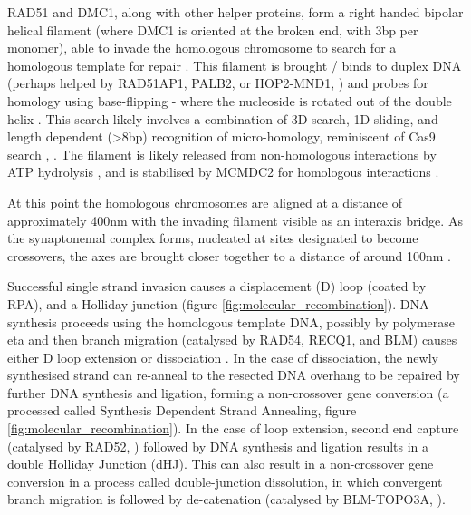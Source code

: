 RAD51 and DMC1, along with other helper proteins, form a right handed bipolar helical filament (where DMC1 is oriented at the broken end, with 3bp per monomer), able to invade the homologous chromosome to search for a homologous template for repair \parencite{Sehorn2004Human, Cloud2012Rad51, Brown2015Small, Brown2015DNA, Crickard2018Spontaneous}.
This filament is brought / binds to duplex DNA (perhaps helped by RAD51AP1, PALB2, or HOP2-MND1, \cite{Petukhova2005Hop2}) and probes for homology using base-flipping - where the nucleoside is rotated out of the double helix \parencite{Gupta1999Rapid, Folta-Stogniew2004Exchange}.
This search likely involves a combination of 3D search, 1D sliding, and length dependent (>8bp) recognition of micro-homology, reminiscent of Cas9 search \parencite{Ragunathan2012RecA,Forget2012Singlemolecule,Renkawitz2013Monitoring,Qi2015DNA,Lee2015Base}, \parencite[reviewed in][]{Barzel2008Finding, Renkawitz2014Mechanisms, Greene2016DNA, Kaniecki2018change, Haber2018DNA}.
The filament is likely released from non-homologous interactions by ATP hydrolysis \parencite{Lee2016ATP}, and is stabilised by MCMDC2 for homologous interactions \parencite{McNairn2017Repair}. 

At this point the homologous chromosomes are aligned at a distance of approximately 400nm with the invading filament visible as an interaxis bridge.
As the synaptonemal complex forms, nucleated at sites designated to become crossovers, the axes are brought closer together to a distance of around 100nm \parencite[reviewed in][]{Zickler2015Recombination}.

Successful single strand invasion causes a displacement (D) loop (coated by RPA), and a Holliday junction (figure \ref{fig:molecular_recombination}).
DNA synthesis proceeds using the homologous template DNA, possibly by polymerase eta \parencite{McIlwraith2005Human, Kawamoto2005Dual} and then branch migration (catalysed by RAD54, RECQ1, and BLM) causes either D loop extension or dissociation \parencite{Bugreev2006Rad54,Bugreev2008RECQ1, Mazina2012Polarity}.
In the case of dissociation, the newly synthesised strand can re-anneal to the resected DNA overhang to be repaired by further DNA synthesis and ligation, forming a non-crossover gene conversion (a processed called Synthesis Dependent Strand Annealing, figure \ref{fig:molecular_recombination}).
In the case of loop extension, second end capture (catalysed by RAD52, \cite{Sugiyama1998DNA, Sugiyama2006Rad52mediated, McIlwraith2008DNA, Lao2008Rad52}) followed by DNA synthesis and ligation results in a double Holliday Junction (dHJ).
This can also result in a non-crossover gene conversion in a process called double-junction dissolution, in which convergent branch migration is followed by de-catenation (catalysed by BLM-TOPO3A, \cite{Wu2003Bloom, Bizard2014Dissolution}).

